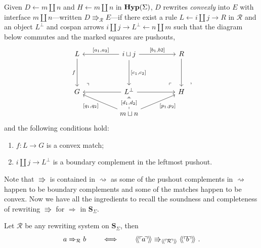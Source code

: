 \begin{definition}
\label{def:convex_dpoi_rewriting}
Given $D \xleftarrow{} m \coprod n$ and $H \xleftarrow{} m \coprod n$ in $\mathbf{Hyp}(\Sigma)$, $D$ rewrites \emph{convexly} into $E$ with interface $m \coprod n$---written $D \Rrightarrow_{\mathcal{R}} E$---if there exist a rule $L \xleftarrow{} i \coprod j \xrightarrow{} R$ in $\mathcal{R}$ and an object $L^{\bot}$ and cospan arrows $i \coprod j \xrightarrow{} L^{\bot} \xleftarrow{} n \coprod m$ such that the diagram below commutes and the marked squares are pushouts,
\[\begin{tikzcd}
	L && {i \coprod j} && R \\
	\\
	G && {L^{\bot}} && H \\
	&& {m \coprod n}
	\arrow["f"', from=1-1, to=3-1]
	\arrow["{[a_1,a_2]}"', from=1-3, to=1-1]
	\arrow["{[b_1,b2]}", from=1-3, to=1-5]
	\arrow["{[c_1,c_2]}", from=1-3, to=3-3]
	\arrow[from=1-5, to=3-5]
	\arrow["\lrcorner"{anchor=center, pos=0.125, rotate=90}, draw=none, from=3-1, to=1-3]
	\arrow[from=3-3, to=3-1]
	\arrow[from=3-3, to=3-5]
	\arrow["\lrcorner"{anchor=center, pos=0.125, rotate=180}, draw=none, from=3-5, to=1-3]
	\arrow["{[q_1,q_2]}", from=4-3, to=3-1]
	\arrow["{[d_1,d_2]}"{description}, from=4-3, to=3-3]
	\arrow["{[p_1,p_2]}"', from=4-3, to=3-5]
\end{tikzcd}~,\]
and the following conditions hold:
\begin{enumerate}
  \item $f : L \to G$ is a convex match;
  \item $i \coprod j \xrightarrow{} L^{\bot}$ is a boundary complement in the leftmost pushout.
\end{enumerate}
\end{definition}
Note that $\Rrightarrow$ is contained in $\rightsquigarrow$ as some of the pushout complements in $\rightsquigarrow$ happen to be boundary complements and some of the matches happen to be convex.
Now we have all the ingredients to recall the soundness and completeness of rewriting $\Rrightarrow$ for $\Rightarrow$ in $\mathbf{S}_{\Sigma}$.
\begin{theorem}\label{theorem:convex_dpoi_rewriting}
Let $\mathcal{R}$ be any rewriting system on $\mathbf{S}_{\Sigma}$, then
\[
a \Rightarrow_{\mathcal{R}} b \qquad \iff \qquad \llangle \corner{a} \rrangle \Rrightarrow_{\llangle \corner{\mathcal{R}} \rrangle} \llangle \corner{b} \rrangle~.
\]
\end{theorem}

